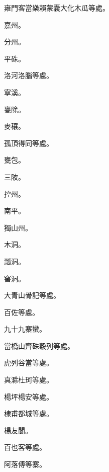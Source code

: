 \begin{pinyinscope}
 雍門客當樂賴蒙囊大化木瓜等處。



 嘉州。



 分州。



 平硃。



 洛河洛腦等處。



 寧溪。



 甕除。



 麥穰。



 孤頂得同等處。



 甕包。



 三陂。



 控州。



 南平。



 獨山州。



 木洞。



 瓢洞。



 窖洞。



 大青山骨記等處。



 百佐等處。



 九十九寨蠻。



 當橋山齊硃穀列等處。



 虎列谷當等處。



 真滁杜珂等處。



 楊坪楊安等處。



 棣甫都城等處。



 楊友閬。



 百也客等處。



 阿落傅等寨。




\end{pinyinscope}
